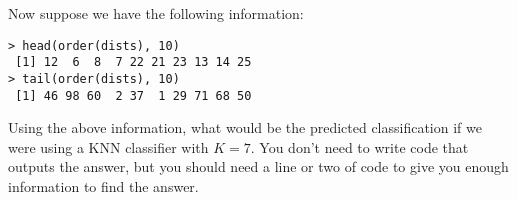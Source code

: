 \documentclass[12pt, leqno]{article}
\begin{document}
\vspace{1.5 cm}

Now suppose we have the following information:
\begin{verbatim}
> head(order(dists), 10)
 [1] 12  6  8  7 22 21 23 13 14 25
> tail(order(dists), 10)
 [1] 46 98 60  2 37  1 29 71 68 50
\end{verbatim}

Using the above information, what would be the predicted classification if we were using a KNN classifier with $K=7$.  You don't need to write code that outputs the answer, but you should need a line or two of code to give you enough information to find the answer. 
\end{document}
